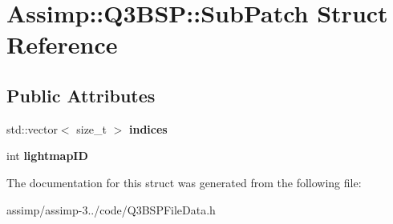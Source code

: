 \hypertarget{struct_assimp_1_1_q3_b_s_p_1_1_sub_patch}{\section{Assimp\+:\+:Q3\+B\+S\+P\+:\+:Sub\+Patch Struct Reference}
\label{struct_assimp_1_1_q3_b_s_p_1_1_sub_patch}
}
\subsection*{Public Attributes}
\begin{DoxyCompactItemize}
\item 
\hypertarget{struct_assimp_1_1_q3_b_s_p_1_1_sub_patch_add9e6563abdf9bca485da044b0fea941}{std\+::vector$<$ size\+\_\+t $>$ {\bfseries indices}}\label{struct_assimp_1_1_q3_b_s_p_1_1_sub_patch_add9e6563abdf9bca485da044b0fea941}

\item 
\hypertarget{struct_assimp_1_1_q3_b_s_p_1_1_sub_patch_a5381b66a53ade177a0bb2e0431e9f4e3}{int {\bfseries lightmap\+I\+D}}\label{struct_assimp_1_1_q3_b_s_p_1_1_sub_patch_a5381b66a53ade177a0bb2e0431e9f4e3}

\end{DoxyCompactItemize}


The documentation for this struct was generated from the following file\+:\begin{DoxyCompactItemize}
\item 
assimp/assimp-\/3../code/Q3\+B\+S\+P\+File\+Data.\+h\end{DoxyCompactItemize}

